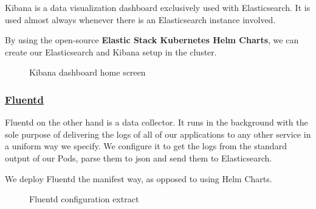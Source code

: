 Kibana is a data visualization dashboard exclusively used with Elasticsearch.
It is used almost always whenever there is an Elasticsearch instance involved.

By using the open-source \textbf{Elastic Stack Kubernetes Helm Charts}, we can create our Elasticsearch and Kibana setup in the cluster.
\begin{figure}[H]
    \centering
    \caption{Kibana dashboard home screen}
    \label{fig:kibana-dashboard-home}
\end{figure}

\subsubsection*{\underline{Fluentd}}
Fluentd on the other hand is a data collector.
It runs in the background with the sole purpose of delivering the logs of all of our applications to any other service in a uniform way we specify.
We configure it to get the logs from the standard output of our Pods, parse them to json and send them to Elasticsearch.

We deploy Fluentd the manifest way, as opposed to using Helm Charts.
\begin{figure}[H]
    \centering
    \caption{Fluentd configuration extract}
    \label{fig:fluentd-config-snippet}
\end{figure}

